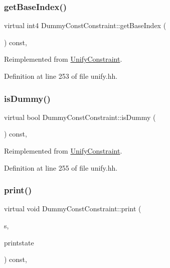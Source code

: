\subsubsection{\texorpdfstring{getBaseIndex()}{getBaseIndex()}}
{\footnotesize\ttfamily virtual int4 Dummy\+Const\+Constraint\+::get\+Base\+Index (\begin{DoxyParamCaption}\item[{void}]{ }\end{DoxyParamCaption}) const\hspace{0.3cm}{\ttfamily [inline]}, {\ttfamily [virtual]}}



Reimplemented from \mbox{\hyperlink{class_unify_constraint_a44f0164f38ac1fdc44fc73ebe7678de1}{Unify\+Constraint}}.



Definition at line 253 of file unify.\+hh.

\mbox{\label{class_dummy_const_constraint_a64003bb0a15a9fa35fb634c8c98f8d1e}} 
\subsubsection{\texorpdfstring{isDummy()}{isDummy()}}
{\footnotesize\ttfamily virtual bool Dummy\+Const\+Constraint\+::is\+Dummy (\begin{DoxyParamCaption}\item[{void}]{ }\end{DoxyParamCaption}) const\hspace{0.3cm}{\ttfamily [inline]}, {\ttfamily [virtual]}}



Reimplemented from \mbox{\hyperlink{class_unify_constraint_a260263ddd2fea5ac847302d12feeb031}{Unify\+Constraint}}.



Definition at line 255 of file unify.\+hh.

\mbox{\label{class_dummy_const_constraint_abbe52ab2155b77250b01f52a0c3b3c25}} 
\subsubsection{\texorpdfstring{print()}{print()}}
{\footnotesize\ttfamily virtual void Dummy\+Const\+Constraint\+::print (\begin{DoxyParamCaption}\item[{ostream \&}]{s,  }\item[{\mbox{\hyperlink{class_unify_c_printer}{Unify\+C\+Printer}} \&}]{printstate }\end{DoxyParamCaption}) const\hspace{0.3cm}{\ttfamily [inline]}, {\ttfamily [virtual]}}



